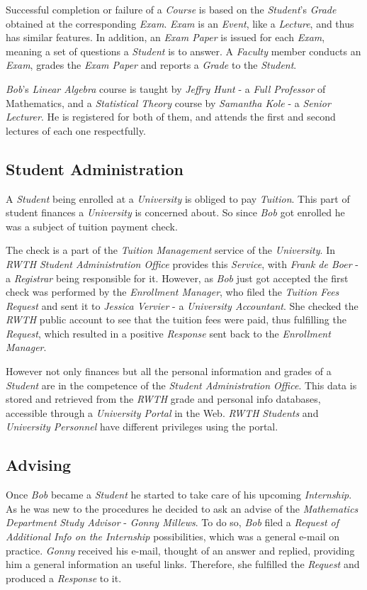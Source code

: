 \documentclass{article}    %
\begin{document}
Successful completion or failure of a \textit{Course} is based on the \textit{Student}'s \textit{Grade} obtained at the corresponding \textit{Exam}. \textit{Exam} is an \textit{Event}, like a \textit{Lecture}, and thus has similar features. In addition, an \textit{Exam Paper} is issued for each \textit{Exam}, meaning a set of questions a \textit{Student} is to answer. A \textit{Faculty} member conducts an \textit{Exam}, grades the \textit{Exam Paper} and reports a \textit{Grade} to the \textit{Student}.

\textit{Bob}'s \textit{Linear Algebra} course is taught by \textit{Jeffry Hunt} - a \textit{Full Professor} of Mathematics, and a \textit{Statistical Theory} course by \textit{Samantha Kole} - a \textit{Senior Lecturer}. He is registered for both of them, and attends the first and second lectures of each one respectfully.
% 
\subsection{Student Administration}
%
A \textit{Student} being enrolled at a \textit{University} is obliged to pay \textit{Tuition}. This part of student finances a \textit{University} is concerned about. So since \textit{Bob} got enrolled he was a subject of tuition payment check. 

The check is a part of the \textit{Tuition Management} service of the \textit{University}. In \textit{RWTH} \textit{Student Administration Office} provides this \textit{Service}, with \textit{Frank de Boer} - a \textit{Registrar} being responsible for it. However, as \textit{Bob} just got accepted the first check was performed by the \textit{Enrollment Manager}, who filed the \textit{Tuition Fees Request} and sent it to \textit{Jessica Vervier} - a \textit{University Accountant}. She checked the \textit{RWTH} public account to see that the tuition fees were paid, thus fulfilling the \textit{Request}, which resulted in a positive \textit{Response} sent back to the \textit{Enrollment Manager}.

However not only finances but all the personal information and grades of a \textit{Student} are in the competence of the \textit{Student Administration Office}. This data is stored and retrieved from the \textit{RWTH} grade and personal info databases, accessible through a \textit{University Portal} in the Web. \textit{RWTH} \textit{Students} and \textit{University Personnel} have different privileges using the portal.
% 
\subsection{Advising}
%
Once \textit{Bob} became a \textit{Student} he started to take care of his upcoming \textit{Internship}. As he was new to the procedures he decided to ask an advise of the \textit{Mathematics Department} \textit{Study Advisor} - \textit{Gonny Millews}. To do so, \textit{Bob} filed a \textit{Request of Additional Info on the Internship} possibilities, which was a general e-mail on practice. \textit{Gonny} received his e-mail, thought of an answer and replied, providing him a general information an useful links. Therefore, she fulfilled the \textit{Request} and produced a \textit{Response} to it.
\end{document}
